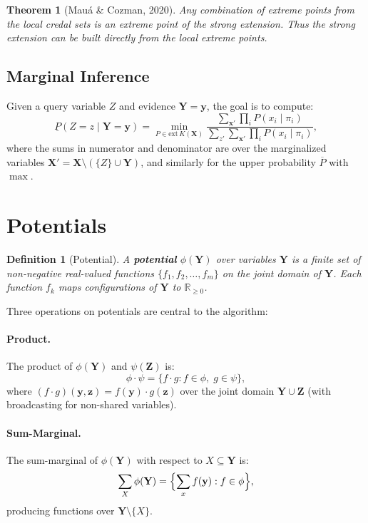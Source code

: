 \documentclass[11pt]{article}
\newtheorem{definition}{Definition}
\newtheorem{theorem}{Theorem}
\begin{document}
\begin{theorem}[Mau\'a \& Cozman, 2020]
Any combination of extreme points from the local credal sets is an extreme point of the
strong extension. Thus the strong extension can be built directly from the local extreme
points.
\end{theorem}

\subsection{Marginal Inference}

Given a query variable $Z$ and evidence $\mathbf{Y} = \mathbf{y}$, the goal is to compute:
\begin{equation}\label{eq:marginal}
  \underline{P}(Z = z \mid \mathbf{Y} = \mathbf{y}) = \min_{P \in \mathrm{ext}\,K(\mathbf{X})}
  \frac{\sum_{\mathbf{x}'} \prod_i P(x_i \mid \pi_i)}
       {\sum_{z'} \sum_{\mathbf{x}'} \prod_i P(x_i \mid \pi_i)},
\end{equation}
where the sums in numerator and denominator are over the marginalized variables
$\mathbf{X}' = \mathbf{X} \setminus (\{Z\} \cup \mathbf{Y})$, and similarly for the
upper probability $\overline{P}$ with $\max$.

\section{Potentials}

\begin{definition}[Potential]
A \textbf{potential} $\phi(\mathbf{Y})$ over variables $\mathbf{Y}$ is a finite set
of non-negative real-valued functions $\{f_1, f_2, \dots, f_m\}$ on the joint domain
of $\mathbf{Y}$. Each function $f_k$ maps configurations of $\mathbf{Y}$ to
$\mathbb{R}_{\geq 0}$.
\end{definition}

Three operations on potentials are central to the algorithm:

\paragraph{Product.}
The product of $\phi(\mathbf{Y})$ and $\psi(\mathbf{Z})$ is:
\[
  \phi \cdot \psi = \{f \cdot g : f \in \phi, \; g \in \psi\},
\]
where $(f \cdot g)(\mathbf{y}, \mathbf{z}) = f(\mathbf{y}) \cdot g(\mathbf{z})$
over the joint domain $\mathbf{Y} \cup \mathbf{Z}$ (with broadcasting for
non-shared variables).

\paragraph{Sum-Marginal.}
The sum-marginal of $\phi(\mathbf{Y})$ with respect to $X \subseteq \mathbf{Y}$ is:
\[
  \sum_{X} \phi(\mathbf{Y}) = \Bigl\{ \sum_{x} f(\mathbf{y}) : f \in \phi \Bigr\},
\]
producing functions over $\mathbf{Y} \setminus \{X\}$.
\end{document}
